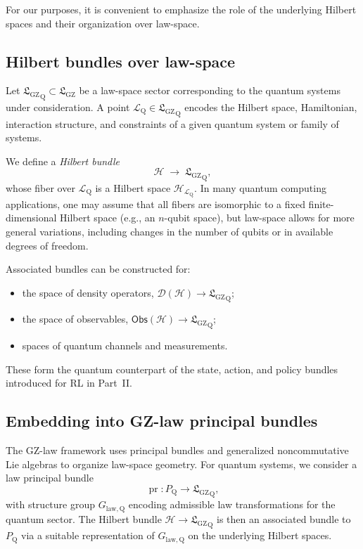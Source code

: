 \documentclass[11pt]{book}
\newcommand{\GZLS}{\ensuremath{\mathfrak{L}_{\mathrm{GZ}}}}
\newcommand{\Bundle}{\ensuremath{P}}
\newcommand{\pr}{\operatorname{pr}}
\theoremstyle{plain}
\theoremstyle{definition}
\theoremstyle{remark}
\begin{document}
For our purposes, it is convenient to emphasize the role of the
underlying Hilbert spaces and their organization over law-space.

\subsection*{Hilbert bundles over law-space}

Let ${\GZLS}_{\mathrm{Q}} \subset \GZLS$ be a law-space sector
corresponding to the quantum systems under consideration. A point
$\mathcal{L}_{\mathrm{Q}} \in {\GZLS}_{\mathrm{Q}}$ encodes the
Hilbert space, Hamiltonian, interaction structure, and constraints
of a given quantum system or family of systems.

We define a \emph{Hilbert bundle}
\[
   \mathcal{H} \;\longrightarrow\; {\GZLS}_{\mathrm{Q}},
\]
whose fiber over $\mathcal{L}_{\mathrm{Q}}$ is a Hilbert space
$\mathcal{H}_{\mathcal{L}_{\mathrm{Q}}}$. In many quantum computing
applications, one may assume that all fibers are isomorphic to a
fixed finite-dimensional Hilbert space (e.g., an $n$-qubit space),
but law-space allows for more general variations, including changes
in the number of qubits or in available degrees of freedom.

Associated bundles can be constructed for:
\begin{itemize}
  \item the space of density operators,
        $\mathcal{D}(\mathcal{H}) \to {\GZLS}_{\mathrm{Q}}$;
  \item the space of observables,
        $\mathsf{Obs}(\mathcal{H}) \to {\GZLS}_{\mathrm{Q}}$;
  \item spaces of quantum channels and measurements.
\end{itemize}
These form the quantum counterpart of the state, action, and policy
bundles introduced for RL in Part~II.

\subsection*{Embedding into GZ-law principal bundles}

The GZ-law framework uses principal bundles and generalized
noncommutative Lie algebras to organize law-space geometry. For
quantum systems, we consider a law principal bundle
\[
   \pr \colon \Bundle_{\mathrm{Q}} \longrightarrow {\GZLS}_{\mathrm{Q}},
\]
with structure group $G_{\mathrm{law,Q}}$ encoding admissible law
transformations for the quantum sector. The Hilbert bundle
$\mathcal{H} \to {\GZLS}_{\mathrm{Q}}$ is then an associated bundle to
$\Bundle_{\mathrm{Q}}$ via a suitable representation of
$G_{\mathrm{law,Q}}$ on the underlying Hilbert spaces.
\end{document}
